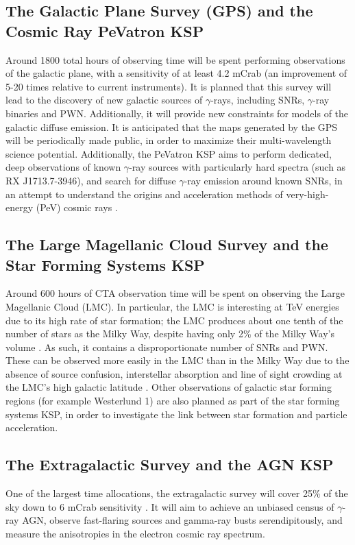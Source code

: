 \subsection{The Galactic Plane Survey (GPS) and the Cosmic Ray PeVatron KSP}
Around 1800 total hours of observing time will be spent performing observations of the galactic plane, with a sensitivity of at least 4.2 mCrab \cite{scienceCTA} (an improvement of 5-20 times relative to current instruments). It is planned that this survey will lead to the discovery of new galactic sources of $\gamma$-rays, including SNRs, $\gamma$-ray binaries and PWN. Additionally, it will provide new constraints for models of the galactic diffuse emission. It is anticipated that the maps generated by the GPS will be periodically made public, in order to maximize their multi-wavelength science potential. Additionally, the PeVatron KSP aims to perform dedicated, deep observations of known $\gamma$-ray sources with particularly hard spectra (such as RX J1713.7-3946), and search for diffuse $\gamma$-ray emission around known SNRs, in an attempt to understand the origins and acceleration methods of very-high-energy (PeV) cosmic rays \cite{scienceCTA}.

\subsection{The Large Magellanic Cloud Survey and the Star Forming Systems KSP} 
Around 600 hours of CTA observation time will be spent on observing the Large Magellanic Cloud (LMC). In particular, the LMC is interesting at TeV energies due to its high rate of star formation; the LMC produces about one tenth of the number of stars as the Milky Way, despite having only 2\% of the Milky Way's volume \cite{scienceCTA}. As such, it contains a disproportionate number of SNRs and PWN.  These can be observed more easily in the LMC than in the Milky Way due to the absence of source confusion, interstellar absorption and line of sight crowding at the LMC's high galactic latitude \cite{scienceCTA}. Other observations of galactic star forming regions (for example Westerlund 1) are also planned as part of the star forming systems KSP, in order to investigate the link between star formation and particle acceleration.

\subsection{The Extragalactic Survey and the AGN KSP} 
One of the largest time allocations, the extragalactic survey will cover 25\% of the sky down to 6 mCrab sensitivity \cite{scienceCTA}. It will aim to achieve an unbiased census of $\gamma$-ray AGN, observe fast-flaring sources and gamma-ray busts serendipitously, and measure the anisotropies in the electron cosmic ray spectrum.

